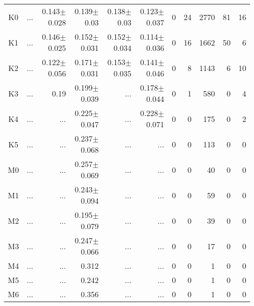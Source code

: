 \begin{table}[t]
\begin{center}
\begin{tabular}{c|rrrrr|rrrrr}
K0	&	 ...	&	0.143$\pm$0.028	&	0.139$\pm$0.03	&	0.138$\pm$0.03	&	0.123$\pm$0.037	&	0	&	24	&	2770	&	81	&	16	\\
K1	&	 ...	&	0.146$\pm$0.025	&	0.152$\pm$0.031	&	0.152$\pm$0.034	&	0.114$\pm$0.036	&	0	&	16	&	1662	&	50	&	6	\\
K2	&	 ...	&	0.122$\pm$0.056	&	0.171$\pm$0.031	&	0.153$\pm$0.035	&	0.141$\pm$0.046	&	0	&	8	&	1143	&	6	&	10	\\
K3	&	 ...	&	0.19	&	0.199$\pm$0.039	&	 ...	&	0.178$\pm$0.044	&	0	&	1	&	580	&	0	&	4	\\
K4	&	 ...	&	 ...	&	0.225$\pm$0.047	&	 ...	&	0.228$\pm$0.071	&	0	&	0	&	175	&	0	&	2	\\
K5	&	 ...	&	 ...	&	0.237$\pm$0.068	&	 ...	&	 ...	&	0	&	0	&	113	&	0	&	0	\\
M0	&	 ...	&	 ...	&	0.257$\pm$0.069	&	 ...	&	 ...	&	0	&	0	&	40	&	0	&	0	\\
M1	&	 ...	&	 ...	&	0.243$\pm$0.094	&	 ...	&	 ...	&	0	&	0	&	59	&	0	&	0	\\
M2	&	 ...	&	 ...	&	0.195$\pm$0.079	&	 ...	&	 ...	&	0	&	0	&	39	&	0	&	0	\\
M3	&	 ...	&	 ...	&	0.247$\pm$0.066	&	 ...	&	 ...	&	0	&	0	&	17	&	0	&	0	\\
M4	&	 ...	&	 ...	&	0.312	&	 ...	&	 ...	&	0	&	0	&	1	&	0	&	0	\\
M5	&	 ...	&	 ...	&	0.242	&	 ...	&	 ...	&	0	&	0	&	1	&	0	&	0	\\
M6	&	 ...	&	 ...	&	0.356	&	 ...	&	 ...	&	0	&	0	&	1	&	0	&	0	\\
    \bottomrule
    \end{tabular}
\end{center}
\end{table}


